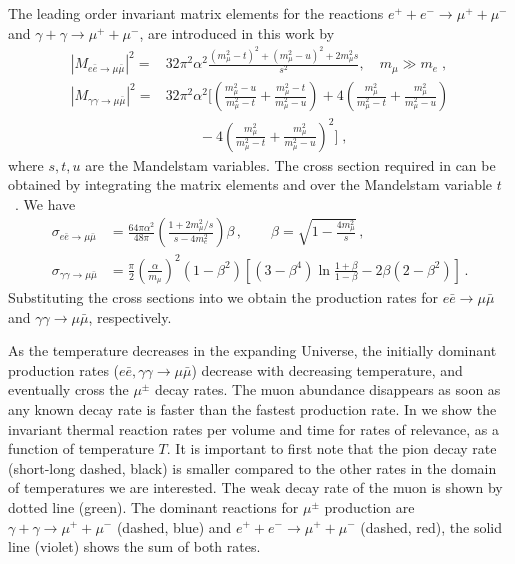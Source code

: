 The leading order invariant matrix elements for the reactions $e^++e^-\to\mu^++\mu^-$ and $\gamma+\gamma\to\mu^++\mu^-$, are introduced in this work by~\cite{Kuznetsova:2008jt}
\begin{align}\label{Mee}
|M_{e\bar e\to\mu\bar\mu}|^2=&32\pi^2\alpha^2\frac{(m_\mu^2-t)^2+(m_\mu^2-u)^2+2m_\mu^2s}{s^2},\quad m_\mu\gg m_e\;,\\[0.2cm]
\label{Mgg}
|M_{\gamma\gamma\to\mu\bar\mu}|^2=&32\pi^2\alpha^2\bigg[\left(\frac{m_\mu^2-u}{m_\mu^2-t}+\frac{m_\mu^2-t}{m_\mu^2-u}\right)+4\left(\frac{m_\mu^2}{m_\mu^2-t}+\frac{m_\mu^2}{m^2_\mu-u}\right)\\[0.1cm] \nonumber
&\hspace{1cm}-4\left(\frac{m_\mu^2}{m^2_\mu-t}+\frac{m^2_\mu}{m^2_\mu-u}\right)^2\bigg]\;,
\end{align}
 where $s, t, u$ are the Mandelstam variables. The cross section required in  can be obtained by integrating the matrix elements  and  over the Mandelstam variable $t$~\cite{Kuznetsova:2010pi}. We have
\begin{align}
\sigma_{e\bar e\to\mu\bar\mu} 
&=\frac{64\pi\alpha^2}{48\pi}\left(\frac{1+2m^2_\mu/s}{s-4m_e^2}\right)\beta\,,\qquad 
\beta =\sqrt{1-\frac{4m^2_\mu}{s}}\, ,\\
\sigma_{\gamma\gamma\to\mu\bar\mu}
 &=\frac{\pi}{2}\left(\frac{\alpha}{m_\mu}\right)^2(1-\beta^2)\left[(3-\beta^4)\ln\frac{1+\beta}{1-\beta}-2\beta(2-\beta^2)\right] \,.
\end{align}
Substituting the cross sections into  we obtain the production rates for $e\bar e\to\mu\bar\mu$ and $\gamma\gamma\to\mu\bar\mu$, respectively.

As the temperature decreases in the expanding Universe, the initially dominant production rates ($e\bar e,\gamma\gamma\to\mu\bar\mu$) decrease with decreasing temperature, and eventually cross the $\mu^\pm$ decay rates. The muon abundance disappears as soon as any known decay rate is faster than the fastest production rate. In  we show the invariant thermal reaction rates per volume and time for rates of relevance, as a function of temperature $T$. It is important to first note that the pion decay rate (short-long dashed, black) is smaller compared to the other rates in the domain of temperatures we are interested. The weak decay rate of the muon is shown by dotted line (green). The dominant reactions for $\mu^\pm$ production are ${\gamma+\gamma\to\mu^++\mu^-}$ (dashed, blue) and $e^++e^-\to\mu^++\mu^-$ (dashed, red), the solid line (violet) shows the sum of both rates. 

